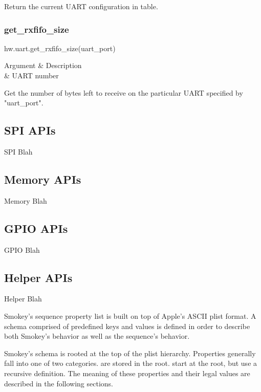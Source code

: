 Return the current UART configuration in table.


\subsubsection{get\_rxfifo\_size}
\begin{LuaApi}
hw.uart.get_rxfifo_size(uart_port)
\end{LuaApi}
\begin{ArgumentTable}
	Argument & Description \\
	 & UART number \\
\end{ArgumentTable}

Get the number of bytes left to receive on the particular UART specified by "uart\_port".

\subsection{SPI APIs}
\label{subsec:SPI}

SPI Blah

\subsection{Memory APIs}
\label{subsec:Memory}

Memory Blah

\subsection{GPIO APIs}
\label{subsec:GPIO}

GPIO Blah

\subsection{Helper APIs}
\label{subsec:Helpers}

Helper Blah

\iffalse
Smokey's sequence property list is built on top of Apple's ASCII plist format.
A schema comprised of predefined keys and values is defined in order to
describe both Smokey's behavior as well as the sequence's behavior.

Smokey's schema is rooted at the top of the plist hierarchy.  Properties
generally fall into one of two categories.   are
stored in the root.   start at the root, but use a
recursive definition.  The meaning of these properties and their legal values
are described in the following sections.

